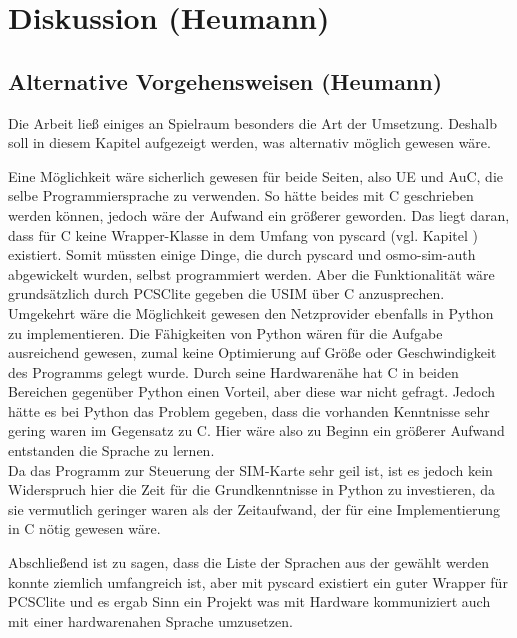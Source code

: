 \clearpage

\section{Diskussion (Heumann)}
\label{diskussion}

	\subsection{Alternative Vorgehensweisen (Heumann)}
	\label{diskussion-alternative}
	
	Die Arbeit ließ einiges an Spielraum besonders die Art der Umsetzung. Deshalb soll in
	diesem Kapitel aufgezeigt werden, was alternativ möglich gewesen wäre.
	
	Eine Möglichkeit wäre sicherlich gewesen für beide Seiten, also UE und AuC, die selbe
	Programmiersprache zu verwenden. So hätte beides mit C geschrieben werden können,
	jedoch wäre der Aufwand ein größerer geworden. Das liegt daran, dass für C keine
	Wrapper-Klasse in dem Umfang von pyscard (vgl. Kapitel ) existiert.
	Somit müssten einige Dinge, die durch pyscard und osmo-sim-auth abgewickelt wurden,
	selbst programmiert werden. Aber die Funktionalität wäre grundsätzlich durch PCSClite
	gegeben die USIM über C anzusprechen. \\
	Umgekehrt wäre die Möglichkeit gewesen den Netzprovider ebenfalls in Python zu
	implementieren. Die Fähigkeiten von Python wären für die Aufgabe ausreichend gewesen,
	zumal keine Optimierung auf Größe oder Geschwindigkeit des Programms gelegt wurde.
	Durch seine Hardwarenähe hat C in beiden Bereichen gegenüber Python einen Vorteil,
	aber diese war nicht gefragt. Jedoch hätte es bei Python das Problem gegeben, dass
	die vorhanden Kenntnisse sehr gering waren im Gegensatz zu C. Hier wäre also zu Beginn
	ein größerer Aufwand entstanden die Sprache zu lernen. \\
	Da das Programm zur Steuerung der SIM-Karte sehr geil ist, ist es jedoch kein Widerspruch
	hier die Zeit für die Grundkenntnisse in Python zu investieren, da sie vermutlich geringer
	waren als der Zeitaufwand, der für eine Implementierung in C nötig gewesen wäre.
	
	Abschließend ist zu sagen, dass die Liste der Sprachen aus der gewählt werden konnte
	ziemlich umfangreich ist, aber mit pyscard existiert ein guter Wrapper für PCSClite und
	es ergab Sinn ein Projekt was mit Hardware kommuniziert auch mit einer hardwarenahen
	Sprache umzusetzen.	
	
